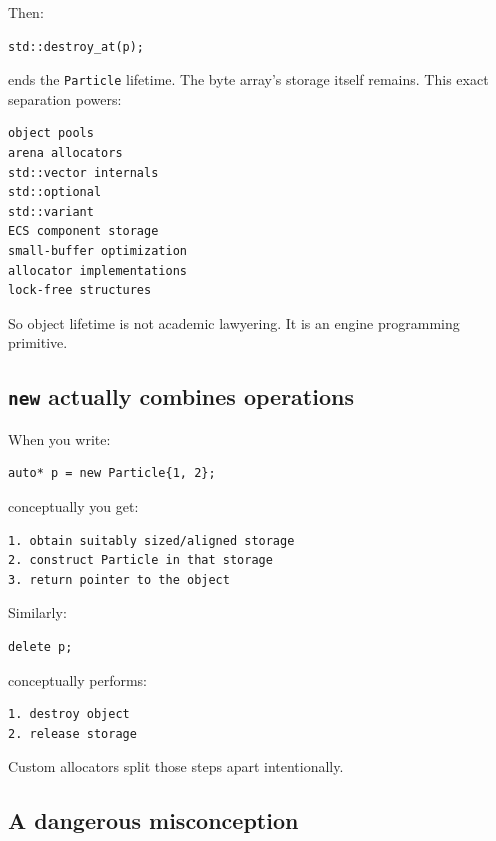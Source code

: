 Then:

\begin{verbatim}
std::destroy_at(p);
\end{verbatim}

ends the \texttt{Particle} lifetime. The byte array's storage itself remains. This exact separation powers:

\begin{verbatim}
object pools
arena allocators
std::vector internals
std::optional
std::variant
ECS component storage
small-buffer optimization
allocator implementations
lock-free structures
\end{verbatim}

So object lifetime is not academic lawyering. It is an engine programming primitive.

\subsection{\texorpdfstring{\texttt{new} actually combines operations}{new actually combines operations}}\label{05-engine-i-ch002-new-actually-combines-operations}

When you write:

\begin{verbatim}
auto* p = new Particle{1, 2};
\end{verbatim}

conceptually you get:

\begin{verbatim}
1. obtain suitably sized/aligned storage
2. construct Particle in that storage
3. return pointer to the object
\end{verbatim}

Similarly:

\begin{verbatim}
delete p;
\end{verbatim}

conceptually performs:

\begin{verbatim}
1. destroy object
2. release storage
\end{verbatim}

Custom allocators split those steps apart intentionally.

\subsection{A dangerous misconception}\label{05-engine-i-ch002-a-dangerous-misconception}

